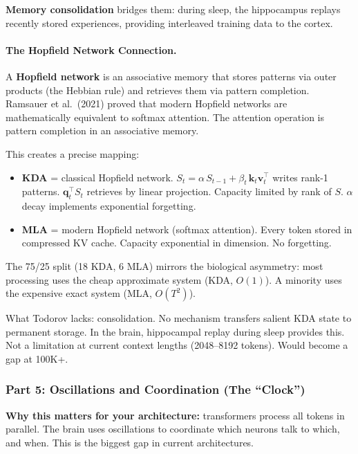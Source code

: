 \documentclass[11pt,a4paper]{article}
\begin{document}
\textbf{Memory consolidation} bridges them: during sleep, the hippocampus replays recently stored experiences, providing interleaved training data to the cortex.

\paragraph{The Hopfield Network Connection.}

A \textbf{Hopfield network} is an associative memory that stores patterns via outer products (the Hebbian rule) and retrieves them via pattern completion. Ramsauer et al.\ (2021) proved that modern Hopfield networks are mathematically equivalent to softmax attention. The attention operation is pattern completion in an associative memory.

This creates a precise mapping:
\begin{itemize}
  \item \textbf{KDA} = classical Hopfield network. $S_t = \alpha \, S_{t-1} + \beta_t \, \mathbf{k}_t \mathbf{v}_t^\top$ writes rank-1 patterns. $\mathbf{q}_t^\top S_t$ retrieves by linear projection. Capacity limited by rank of $S$. $\alpha$ decay implements exponential forgetting.
  \item \textbf{MLA} = modern Hopfield network (softmax attention). Every token stored in compressed KV cache. Capacity exponential in dimension. No forgetting.
\end{itemize}

The 75/25 split (18 KDA, 6 MLA) mirrors the biological asymmetry: most processing uses the cheap approximate system (KDA, $O(1)$). A minority uses the expensive exact system (MLA, $O(T^2)$).

What Todorov lacks: consolidation. No mechanism transfers salient KDA state to permanent storage. In the brain, hippocampal replay during sleep provides this. Not a limitation at current context lengths (2048--8192 tokens). Would become a gap at 100K+.

\subsubsection{Part 5: Oscillations and Coordination (The ``Clock'')}

\textbf{Why this matters for your architecture:} transformers process all tokens in parallel. The brain uses oscillations to coordinate which neurons talk to which, and when. This is the biggest gap in current architectures.
\end{document}
